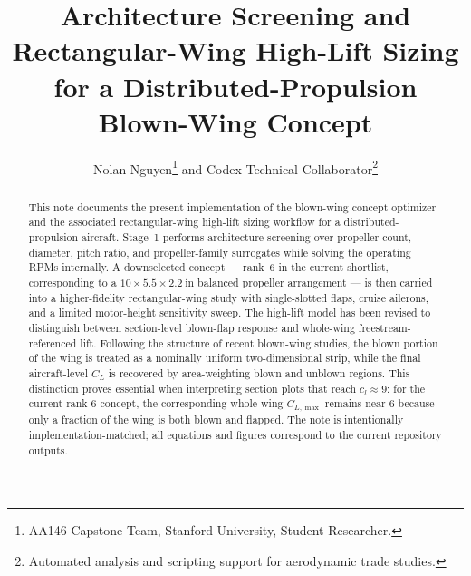 \documentclass[conf]{new-aiaa}
\title{Architecture Screening and Rectangular-Wing High-Lift Sizing for a Distributed-Propulsion Blown-Wing Concept}
\author{Nolan Nguyen\footnote{AA146 Capstone Team, Stanford University, Student Researcher.} and Codex Technical Collaborator\footnote{Automated analysis and scripting support for aerodynamic trade studies.}}
\affil{AA146 Capstone, Stanford University, Stanford, California, 94305}
\begin{document}
\maketitle

\begin{abstract}
This note documents the present implementation of the blown-wing concept optimizer and the associated rectangular-wing high-lift sizing workflow for a distributed-propulsion aircraft. Stage~1 performs architecture screening over propeller count, diameter, pitch ratio, and propeller-family surrogates while solving the operating RPMs internally. A downselected concept --- rank~6 in the current shortlist, corresponding to a \(10\times 5.5\times 2.2\ \mathrm{in}\) balanced propeller arrangement --- is then carried into a higher-fidelity rectangular-wing study with single-slotted flaps, cruise ailerons, and a limited motor-height sensitivity sweep. The high-lift model has been revised to distinguish between section-level blown-flap response and whole-wing freestream-referenced lift. Following the structure of recent blown-wing studies, the blown portion of the wing is treated as a nominally uniform two-dimensional strip, while the final aircraft-level \(C_L\) is recovered by area-weighting blown and unblown regions. This distinction proves essential when interpreting section plots that reach \(c_l\approx 9\): for the current rank-6 concept, the corresponding whole-wing \(C_{L,\max}\) remains near 6 because only a fraction of the wing is both blown and flapped. The note is intentionally implementation-matched; all equations and figures correspond to the current repository outputs.
\end{abstract}
\end{document}
